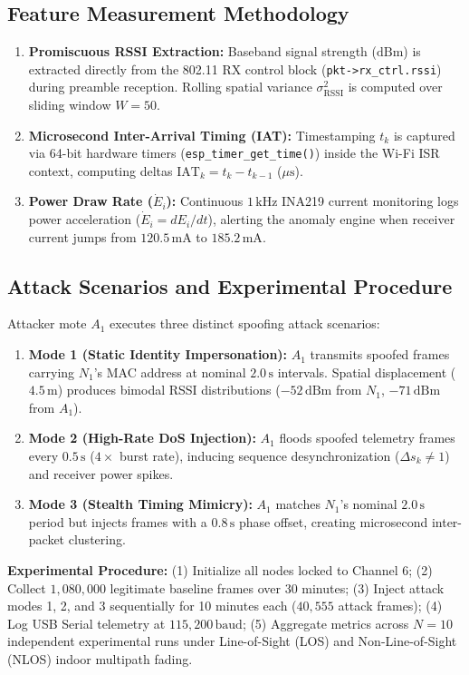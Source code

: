 \subsection{Feature Measurement Methodology}
\begin{enumerate}
    \item \textbf{Promiscuous RSSI Extraction:} Baseband signal strength ($\text{dBm}$) is extracted directly from the 802.11 RX control block (\texttt{pkt->rx\_ctrl.rssi}) during preamble reception. Rolling spatial variance $\sigma^2_{\text{RSSI}}$ is computed over sliding window $W=50$.
    \item \textbf{Microsecond Inter-Arrival Timing (IAT):} Timestamping $t_k$ is captured via 64-bit hardware timers (\texttt{esp\_timer\_get\_time()}) inside the Wi-Fi ISR context, computing deltas $\text{IAT}_k = t_k - t_{k-1}$ ($\mu\text{s}$).
    \item \textbf{Power Draw Rate ($\dot{E}_i$):} Continuous $1\,\text{kHz}$ INA219 current monitoring logs power acceleration ($\dot{E}_i = dE_i/dt$), alerting the anomaly engine when receiver current jumps from $120.5\,\text{mA}$ to $185.2\,\text{mA}$.
\end{enumerate}

\subsection{Attack Scenarios and Experimental Procedure}
Attacker mote $A_1$ executes three distinct spoofing attack scenarios:
\begin{enumerate}
    \item \textbf{Mode 1 (Static Identity Impersonation):} $A_1$ transmits spoofed frames carrying $N_1$'s MAC address at nominal $2.0\,\text{s}$ intervals. Spatial displacement ($4.5\,\text{m}$) produces bimodal RSSI distributions ($-52\,\text{dBm}$ from $N_1$, $-71\,\text{dBm}$ from $A_1$).
    \item \textbf{Mode 2 (High-Rate DoS Injection):} $A_1$ floods spoofed telemetry frames every $0.5\,\text{s}$ ($4\times$ burst rate), inducing sequence desynchronization ($\Delta s_k \neq 1$) and receiver power spikes.
    \item \textbf{Mode 3 (Stealth Timing Mimicry):} $A_1$ matches $N_1$'s nominal $2.0\,\text{s}$ period but injects frames with a $0.8\,\text{s}$ phase offset, creating microsecond inter-packet clustering.
\end{enumerate}

\textbf{Experimental Procedure:} (1) Initialize all nodes locked to Channel 6; (2) Collect $1,080,000$ legitimate baseline frames over 30 minutes; (3) Inject attack modes 1, 2, and 3 sequentially for 10 minutes each ($40,555$ attack frames); (4) Log USB Serial telemetry at $115,200\,\text{baud}$; (5) Aggregate metrics across $N = 10$ independent experimental runs under Line-of-Sight (\ac{LOS}) and Non-Line-of-Sight (\ac{NLOS}) indoor multipath fading.

